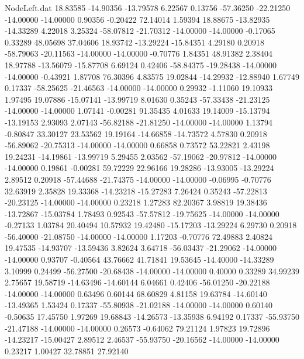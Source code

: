 \begin{filecontents}{NodeLeft.dat}
  18.83585  -14.90356  -13.79578     6.22567    0.13756  -57.36250  -22.21250  -14.00000  -14.00000    0.90356   -0.20422   72.14014    1.59394
  18.88675  -13.82935  -14.33289     4.22018    3.25324  -58.07812  -21.70312  -14.00000  -14.00000   -0.17065    0.33289   48.05698   37.04606
  18.93742  -13.29224  -15.84351     4.29180    0.20918  -58.79063  -20.11563  -14.00000  -14.00000   -0.70776    1.84351   48.91382    2.38404
  18.97788  -13.56079  -15.87708     6.69124    0.42406  -58.84375  -19.28438  -14.00000  -14.00000   -0.43921    1.87708   76.30396    4.83575
  19.02844  -14.29932  -12.88940     1.67749    0.17337  -58.25625  -21.46563  -14.00000  -14.00000    0.29932   -1.11060   19.10933    1.97495
  19.07886  -15.07141  -13.99719     8.01630    0.35243  -57.33438  -21.23125  -14.00000  -14.00000    1.07141   -0.00281   91.35435    4.01633
  19.14009  -15.13794  -13.19153     2.93093    2.07143  -56.82188  -21.81250  -14.00000  -14.00000    1.13794   -0.80847   33.30127   23.53562
  19.19164  -14.66858  -14.73572     4.57830    0.20918  -56.89062  -20.75313  -14.00000  -14.00000    0.66858    0.73572   53.22821    2.43198
  19.24231  -14.19861  -13.99719     5.29455    2.03562  -57.19062  -20.97812  -14.00000  -14.00000    0.19861   -0.00281   59.72229   22.96166
  19.28286  -13.93005  -13.29224     2.89512    0.20918  -57.44688  -21.74375  -14.00000  -14.00000   -0.06995   -0.70776   32.63919    2.35828
  19.33368  -14.23218  -15.27283     7.26424    0.35243  -57.22813  -20.23125  -14.00000  -14.00000    0.23218    1.27283   82.20367    3.98819
  19.38436  -13.72867  -15.03784     1.78493    0.92543  -57.57812  -19.75625  -14.00000  -14.00000   -0.27133    1.03784   20.40494   10.57932
  19.42480  -15.17203  -13.29224     6.29730    0.20918  -56.40000  -21.08750  -14.00000  -14.00000    1.17203   -0.70776   72.49883    2.40824
  19.47535  -14.93707  -13.59436     3.82624    3.64718  -56.03437  -21.29062  -14.00000  -14.00000    0.93707   -0.40564   43.76662   41.71841
  19.53645  -14.40000  -14.33289     3.10999    0.24499  -56.27500  -20.68438  -14.00000  -14.00000    0.40000    0.33289   34.99239    2.75657
  19.58719  -14.63496  -14.60144     6.04661    0.42406  -56.01250  -20.22188  -14.00000  -14.00000    0.63496    0.60144   68.60829    4.81158
  19.63784  -14.60140  -13.49365     1.53424    0.17337  -55.80938  -21.02188  -14.00000  -14.00000    0.60140   -0.50635   17.45750    1.97269
  19.68843  -14.26573  -13.35938     6.94192    0.17337  -55.93750  -21.47188  -14.00000  -14.00000    0.26573   -0.64062   79.21124    1.97823
  19.72896  -14.23217  -15.00427     2.89512    2.46537  -55.93750  -20.16562  -14.00000  -14.00000    0.23217    1.00427   32.78851   27.92140

\end{filecontents}
